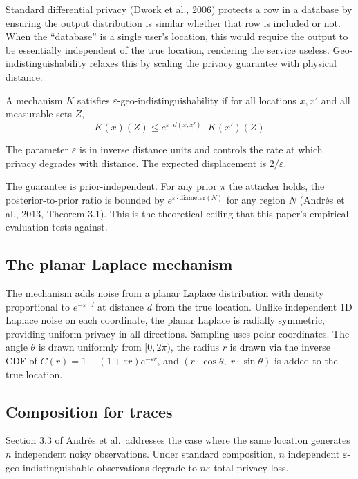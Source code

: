 \documentclass[11pt]{article}
\begin{document}
Standard differential privacy (Dwork et al., 2006) protects a row in a database by ensuring the output distribution is similar whether that row is included or not. When the ``database'' is a single user's location, this would require the output to be essentially independent of the true location, rendering the service useless. Geo-indistinguishability relaxes this by scaling the privacy guarantee with physical distance.

A mechanism $K$ satisfies $\varepsilon$-geo-indistinguishability if for all locations $x, x'$ and all measurable sets $Z$,
\begin{equation}
K(x)(Z) \leq e^{\varepsilon \cdot d(x,x')} \cdot K(x')(Z)
\end{equation}

The parameter $\varepsilon$ is in inverse distance units and controls the rate at which privacy degrades with distance. The expected displacement is $2/\varepsilon$.

The guarantee is prior-independent. For any prior $\pi$ the attacker holds, the posterior-to-prior ratio is bounded by $e^{\varepsilon \cdot \text{diameter}(N)}$ for any region $N$ (Andr\'es et al., 2013, Theorem 3.1). This is the theoretical ceiling that this paper's empirical evaluation tests against.

\subsection{The planar Laplace mechanism}

The mechanism adds noise from a planar Laplace distribution with density proportional to $e^{-\varepsilon \cdot d}$ at distance $d$ from the true location. Unlike independent 1D Laplace noise on each coordinate, the planar Laplace is radially symmetric, providing uniform privacy in all directions. Sampling uses polar coordinates. The angle $\theta$ is drawn uniformly from $[0, 2\pi)$, the radius $r$ is drawn via the inverse CDF of $C(r) = 1 - (1 + \varepsilon r)e^{-\varepsilon r}$, and $(r \cdot \cos\theta,\; r \cdot \sin\theta)$ is added to the true location.

\subsection{Composition for traces}

Section 3.3 of Andr\'es et al.\ addresses the case where the same location generates $n$ independent noisy observations. Under standard composition, $n$ independent $\varepsilon$-geo-indistinguishable observations degrade to $n\varepsilon$ total privacy loss.
\end{document}

